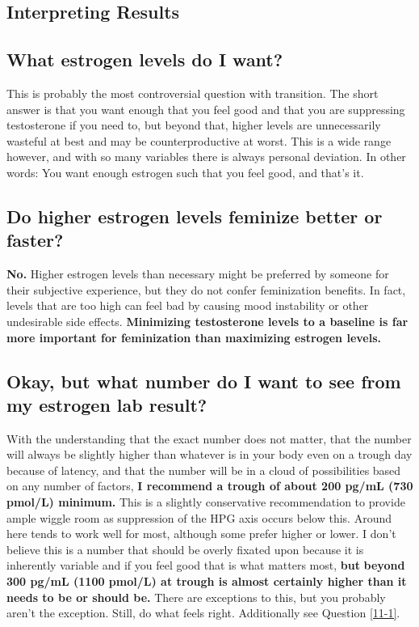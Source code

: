 \documentclass{article}
\begin{document}
\subsection*{Interpreting Results}

\subsection{What estrogen levels do I want?}

This is probably the most controversial question with transition. The short answer is that you want enough that you feel good and that you are suppressing testosterone if you need to, but beyond that, higher levels are unnecessarily wasteful at best and may be counterproductive at worst. This is a wide range however, and with so many variables there is always personal deviation. In other words: You want enough estrogen such that you feel good, and that’s it.

\subsection{Do higher estrogen levels feminize better or faster?}

\textbf{No.} Higher estrogen levels than necessary might be preferred by someone for their subjective experience, but they do not confer feminization benefits. In fact, levels that are too high can feel bad by causing mood instability or other undesirable side effects. \textbf{Minimizing testosterone levels to a baseline is far more important for feminization than maximizing estrogen levels.}

\subsection{Okay, but what number do I want to see from my estrogen lab result?}

With the understanding that the exact number does not matter, that the number will always be slightly higher than whatever is in your body even on a trough day because of latency, and that the number will be in a cloud of possibilities based on any number of factors, \textbf{I recommend a trough of about 200 pg/mL (730 pmol/L) minimum.} This is a slightly conservative recommendation to provide ample wiggle room as suppression of the HPG axis occurs below this. Around here tends to work well for most, although some prefer higher or lower. I don’t believe this is a number that should be overly fixated upon because it is inherently variable and if you feel good that is what matters most, \textbf{but} \textbf{beyond 300 pg/mL (1100 pmol/L) at trough is almost certainly higher than it needs to be or should be.} There are exceptions to this, but you probably aren't the exception. Still, do what feels right. Additionally see Question \ref{11-1}.
\end{document}

